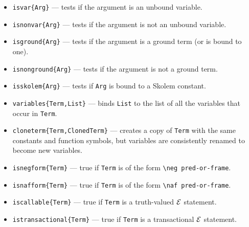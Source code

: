 \documentclass[11pt]{article}
\newcommand{\ERGO}{\mbox{\ensuremath{\cal{E}}\smaller{{\sc{RGO}}}}\xspace}
\newcommand{\FLSYSTEM}{\ERGO}
\newcommand{\bs}{\textbackslash}
\begin{document}
\begin{itemize}
  to) an abstract symbol. An abstract symbol is any atom that is not an
  internal representation of a string or an IRI. (These internal
  representations involve special unprintable characters and thus are
  unlikely to be used by a normal user directly.)
\item \texttt{isvar\{Arg\}} --- tests if the argument is an unbound variable.
\item \texttt{isnonvar\{Arg\}} --- tests if the argument is not an unbound variable.
\item \texttt{isground\{Arg\}} --- tests if the argument is a ground term (or
  is bound to one).
\item \texttt{isnonground\{Arg\}} --- tests if the argument is not a ground term.
\item \texttt{isskolem\{Arg\}} --- tests if \texttt{Arg} is bound to a Skolem
  constant.  
\item \texttt{variables\{Term,List\}} --- binds \texttt{List} to the list
  of all the variables that occur in \texttt{Term}.   

\item \texttt{cloneterm\{Term,ClonedTerm\}} --- creates a copy of
  \texttt{Term} with the same constants and function symbols, but variables
  are consistently renamed to become new variables.
  
\item \texttt{isnegform\{Term\}} --- true if \texttt{Term} is of the form
  \texttt{\bs{}neg pred-or-frame}.  

\item \texttt{isnafform\{Term\}} --- true if \texttt{Term} is of the form
  \texttt{\bs{}naf pred-or-frame}.  

\item \texttt{iscallable\{Term\}} --- true if \texttt{Term} is a
  truth-valued \FLSYSTEM statement.

\item \texttt{istransactional\{Term\}} --- true if \texttt{Term} is a
  transactional \FLSYSTEM statement.

\end{itemize}
\end{document}
